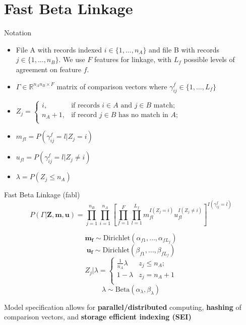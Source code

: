 \documentclass{beamer}
\begin{document}
\section{Fast Beta Linkage}
\begin{frame}{Notation}
\begin{itemize}
	\item File A with records indexed $i \in \{1, \ldots, n_A\}$ and file B with records $j \in \{1, \ldots, n_B\}$. We use $F$ features for linkage, with $L_f$ possible levels of agreement on feature $f$.
	
	\item $\Gamma \in \mathbb{R}^{n_A n_B \times F}$ matrix of comparison vectors where $\gamma_{ij}^f \in \{1, \ldots, L_f\}$
	
	\item $Z_j = \begin{cases} 
	i,  & \text{if records } i\in A \text{ and } j\in B \text{ match}; \\
	n_A + 1,  & \text{if record } j\in B \text{ has no match in } A; \\
	\end{cases}$
	
	\item $m_{fl} = P\left(\gamma_{ij}^f = l |Z_j = i\right)$
	
	\item $u_{fl} = P\left(\gamma_{ij}^f = l |Z_j \neq i\right)$
	
	\item $\lambda = P(Z_j \leq n_A)$
\end{itemize}
\end{frame}

\begin{frame}{Fast Beta Linkage (fabl)}
	$$P(\Gamma|\mathbf{Z}, \mathbf{m}, \mathbf{u}) = \prod_{j=1}^{n_B}  \prod_{i=1}^{n_A}\left[ \prod_{f=1}^{F}\prod_{l=1}^{L_f} m_{fl}^{I(Z_j = i)}u_{fl}^{I(Z_j \neq i)}\right]^{I(\gamma_{ij}^f = l)}$$
	
	$$\mathbf{m_{f}} \sim \text{Dirichlet}(\alpha_{f1}, \ldots, \alpha_{fL_f})$$
	$$\mathbf{u_{f}} \sim \text{Dirichlet}(\beta_{f1}, \ldots, \beta_{fL_f})$$
	$$Z_j | \lambda =
	\begin{cases} 
	\frac{1}{n_A}\lambda  & z_j \leq n_A; \\
	1-\lambda &  z_j  = n_A + 1 \\
	\end{cases}$$
	$$\lambda \sim \text{Beta}(\alpha_{\lambda}, \beta_{\lambda})$$
	
	Model specification allows for \textbf{parallel/distributed} computing, \textbf{hashing} of comparison vectors, and \textbf{storage efficient indexing (SEI)}
\end{frame}
\end{document}
